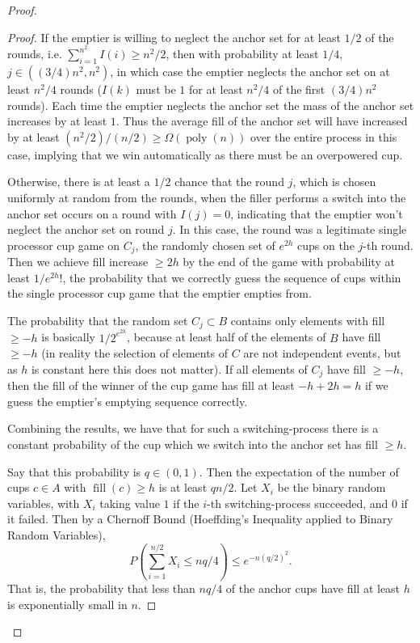 \documentclass[twocolumn]{article}[11pt]
\DeclareMathOperator{\poly}{\text{poly}}
\DeclareMathOperator{\fil}{\text{fill}}
\begin{document}
\begin{proof}
\begin{proof}
  If the emptier is willing to neglect the anchor set for at least $1/2$ of the
  rounds, i.e. $\sum_{i=1}^{n^2} I(i) \ge n^2 / 2$, then with probability at
  least $1/4$, $j \in ((3/4) n^2, n^2)$, in which case the emptier neglects the anchor set
  on at least $n^2/4$ rounds ($I(k)$ must be $1$ for at least $n^2/4$ of the
  first $(3/4)n^2$ rounds). Each time the emptier neglects the anchor set the
  mass of the anchor set increases by at least $1$. Thus the average fill of the anchor
  set will have increased by at least $(n^2/2)/(n/2) \ge \Omega(\poly(n))$ over the
  entire process in this case, implying that we  win automatically as there
  must be an overpowered cup. 

  Otherwise, there is at least a $1/2$ chance that the round $j$, which is
  chosen uniformly at random from the rounds, when the filler performs a switch
  into the anchor set occurs on a round with $I(j)=0$, indicating that the emptier
  won't neglect the anchor set on round $j$. In this case, the round was a
  legitimate single processor cup game on $C_j$, the randomly chosen set of
  $e^{2h}$ cups on the $j$-th round. Then we achieve fill increase $\ge 2h$ by the
  end of the game with probability at least $1/e^{2h}!$, the probability that we
  correctly guess the sequence of cups within the single processor cup game
  that the emptier empties from. 

  The probability that the random set $C_j \subset B$ contains only elements
  with fill $\ge -h$ is basically $1/2^{e^{2h}}$, because at least half of the
  elements of $B$ have fill $\ge -h$ ({\color{red}in reality the selection of
    elements of $C$ are not independent events, but as $h$ is constant here this
  does not matter}). If all elements of $C_j$ have fill $\ge -h$, then the fill
  of the winner of the cup game has fill at least $-h + 2h = h$ if we guess the
  emptier's emptying sequence correctly.

  Combining the results, we have that for such a switching-process there is a
  constant probability of the cup which we switch into the anchor set has fill
  $\ge h$. 

  Say that this probability is $q \in (0,1)$. Then the expectation of the
  number of cups $c \in A$ with $\fil(c) \ge h$ is at least $qn/2$. Let $X_i$
  be the binary random variables, with $X_i$ taking value $1$ if the $i$-th
  switching-process succeeded, and $0$ if it failed. Then by a Chernoff Bound
  (Hoeffding's Inequality applied to Binary Random Variables),
  $$P\left(\sum_{i=1}^{n/2} X_i\le nq/4\right) \le e^{-n(q/2)^2}.$$ 
  That is, the probability that less than $nq/4$ of the anchor cups have fill
  at least $h$ is exponentially small in $n$.


\end{proof}
\end{proof}
\end{document}

